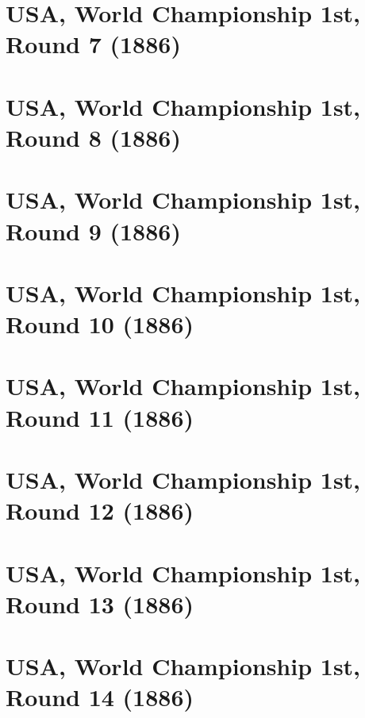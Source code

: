\documentclass[11pt]{article}
\newcommand*\cleartoleftpage{%
   \clearpage
   \ifodd\value{page}\hbox{}\newpage\fi
}
\begin{document}
\cleartoleftpage

\section{USA, World Championship 1st, Round 7 (1886)}


\cleartoleftpage

\section{USA, World Championship 1st, Round 8 (1886)}


\cleartoleftpage

\section{USA, World Championship 1st, Round 9 (1886)}


\cleartoleftpage

\section{USA, World Championship 1st, Round 10 (1886)}


\cleartoleftpage

\section{USA, World Championship 1st, Round 11 (1886)}


\cleartoleftpage

\section{USA, World Championship 1st, Round 12 (1886)}


\cleartoleftpage

\section{USA, World Championship 1st, Round 13 (1886)}


\cleartoleftpage

\section{USA, World Championship 1st, Round 14 (1886)}

\end{document}
